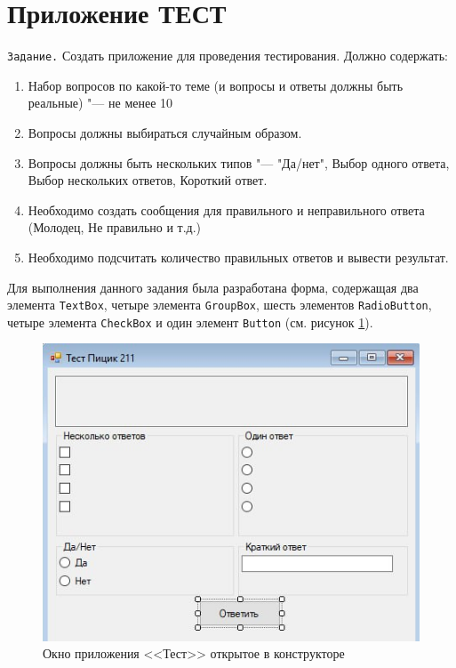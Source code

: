 \section{Приложение ТЕСТ}
\verb|Задание.| Создать приложение для проведения тестирования. Должно содержать:
\begin{enumerate}
    \item Набор вопросов по какой-то теме (и вопросы и ответы должны быть реальные) "--- не менее 10
    \item Вопросы должны выбираться случайным образом.
    \item Вопросы должны быть нескольких типов "--- "Да/нет", Выбор одного ответа, Выбор нескольких ответов, Короткий ответ.
    \item Необходимо создать сообщения для правильного и неправильного ответа (Молодец, Не правильно и т.д.)
    \item Необходимо подсчитать количество правильных ответов и вывести результат.
\end{enumerate}

Для выполнения данного задания была разработана форма, содержащая два элемента 
\verb|TextBox|, четыре элемента \verb|GroupBox|, шесть элементов \verb|RadioButton|, 
четыре элемента \verb|CheckBox| и один элемент \verb|Button| (см. рисунок \ref{fig:test_const}).
\begin{figure}[H]
\centering
\includegraphics[scale=.85]{../img/test/test_const.jpg}
\caption{Окно приложения <<Тест>> открытое в конструкторе}
\label{fig:test_const}
\end{figure}

